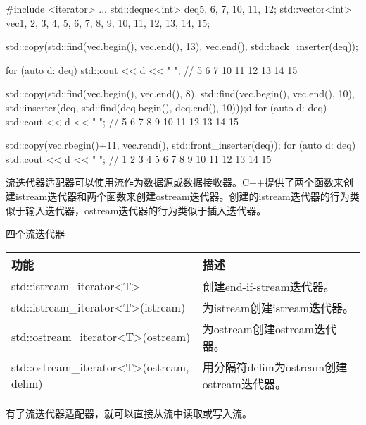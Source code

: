 \begin{cpp}
#include <iterator>
...
std::deque<int> deq{5, 6, 7, 10, 11, 12};
std::vector<int> vec{1, 2, 3, 4, 5, 6, 7, 8, 9, 10, 11, 12, 13, 14, 15};

std::copy(std::find(vec.begin(), vec.end(), 13),
			vec.end(), std::back_inserter(deq));

for (auto d: deq) std::cout << d << " ";
	// 5 6 7 10 11 12 13 14 15

std::copy(std::find(vec.begin(), vec.end(), 8),
std::find(vec.begin(), vec.end(), 10),
std::inserter(deq,
std::find(deq.begin(), deq.end(), 10)));d
for (auto d: deq) std::cout << d << " ";
	// 5 6 7 8 9 10 11 12 13 14 15
	
std::copy(vec.rbegin()+11, vec.rend(),
std::front_inserter(deq));
for (auto d: deq) std::cout << d << " ";
		// 1 2 3 4 5 6 7 8 9 10 11 12 13 14 15
\end{cpp}



流迭代器适配器可以使用流作为数据源或数据接收器。C++提供了两个函数来创建istream迭代器和两个函数来创建ostream迭代器。创建的istream迭代器的行为类似于输入迭代器，ostream迭代器的行为类似于插入迭代器。

\begin{center}
四个流迭代器
\end{center}


\begin{longtable}[c]{|l|l|}
\hline
\textbf{功能}                                         & \textbf{描述}                     \\ \hline
\endfirsthead
%
\endhead
%
std::istream\_iterator\textless{}T\textgreater{}          & 创建end-if-stream迭代器。       \\ \hline
std::istream\_iterator\textless{}T\textgreater{}(istream) & 为istream创建istream迭代器。 \\ \hline
std::ostream\_iterator\textless{}T\textgreater{}(ostream) & 为ostream创建ostream迭代器。 \\ \hline
std::ostream\_iterator\textless{}T\textgreater{}(ostream, delim) & 用分隔符delim为ostream创建ostream迭代器。 \\ \hline
\end{longtable}

有了流迭代器适配器，就可以直接从流中读取或写入流。

